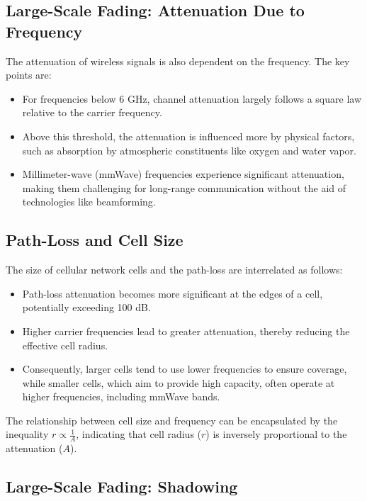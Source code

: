 \subsection*{Large-Scale Fading: Attenuation Due to Frequency}

The attenuation of wireless signals is also dependent on the frequency. The key points are:

\begin{itemize}
    \item For frequencies below 6 GHz, channel attenuation largely follows a square law relative to the carrier frequency.
    \item Above this threshold, the attenuation is influenced more by physical factors, such as absorption by atmospheric constituents like oxygen and water vapor.
    \item Millimeter-wave (mmWave) frequencies experience significant attenuation, making them challenging for long-range communication without the aid of technologies like beamforming.
\end{itemize}
\subsection*{Path-Loss and Cell Size}

The size of cellular network cells and the path-loss are interrelated as follows:

\begin{itemize}
    \item Path-loss attenuation becomes more significant at the edges of a cell, potentially exceeding 100 dB.
    \item Higher carrier frequencies lead to greater attenuation, thereby reducing the effective cell radius.
    \item Consequently, larger cells tend to use lower frequencies to ensure coverage, while smaller cells, which aim to provide high capacity, often operate at higher frequencies, including mmWave bands.
\end{itemize}

The relationship between cell size and frequency can be encapsulated by the inequality \(r \propto \frac{1}{A}\), indicating that cell radius (\(r\)) is inversely proportional to the attenuation (\(A\)).

\subsection*{Large-Scale Fading: Shadowing}

